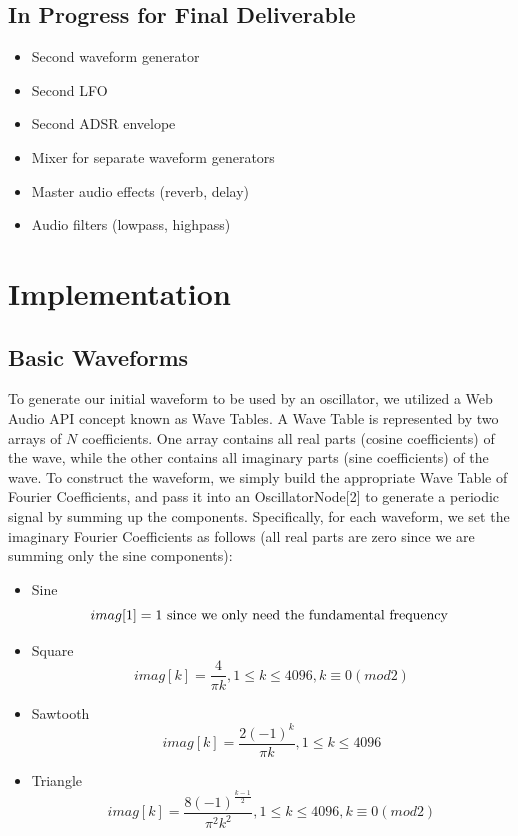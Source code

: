 \documentclass[a4paper, 12pt]{article}
\begin{document}
\subsection*{In Progress for Final Deliverable}
\begin{itemize}
\item Second waveform generator
\item Second LFO
\item Second ADSR envelope
\item Mixer for separate waveform generators
\item Master audio effects (reverb, delay)
\item Audio filters (lowpass, highpass)
\end{itemize}
\section*{Implementation}

\subsection*{Basic Waveforms}

To generate our initial waveform to be used by an oscillator, we utilized a Web Audio API concept known as Wave Tables. A Wave Table is represented by two arrays of $N$ coefficients. One array contains all real parts (cosine coefficients) of the wave, while the other contains all imaginary parts (sine coefficients) of the wave. To construct the waveform, we simply build the appropriate Wave Table of Fourier Coefficients, and pass it into an OscillatorNode[2] to generate a periodic signal by summing up the components. Specifically, for each waveform, we set the imaginary Fourier Coefficients as follows (all real parts are zero since we are summing only the sine components):

\begin{itemize}
\item Sine
$$imag[1] = 1 \textnormal{ since we only need the fundamental frequency }$$
\item Square
$$imag[k] = \frac{4}{\pi k}, 1 \leq k \leq 4096, k \equiv 0 (mod 2)$$
\item Sawtooth
$$imag[k] = \frac{2(-1)^k}{\pi k}, 1 \leq k \leq 4096$$
\item Triangle
$$imag[k] = \frac{8(-1)^{\frac{k-1}{2}}}{\pi^2 k^2}, 1 \leq k \leq 4096, k \equiv 0 (mod 2)$$
\end{itemize}
\end{document}
